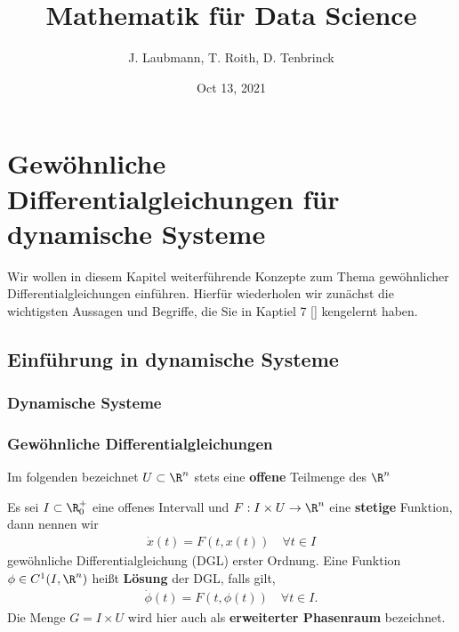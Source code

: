 \documentclass[letterpaper,10pt,english]{jupyterBook}
\title{Mathematik für Data Science}
\date{Oct 13, 2021}
\author{J.\@{} Laubmann, T.\@{} Roith, D.\@{} Tenbrinck}
\begin{document}
\label{\detokenize{intro::doc}}



\chapter{Gewöhnliche Differentialgleichungen für dynamische Systeme}
\label{\detokenize{ode/ode:gewohnliche-differentialgleichungen-fur-dynamische-systeme}}\label{\detokenize{ode/ode::doc}}
Wir wollen in diesem Kapitel weiterführende Konzepte zum Thema gewöhnlicher Differentialgleichungen einführen. Hierfür wiederholen wir zunächst die wichtigsten Aussagen und Begriffe, die Sie in Kaptiel 7 {[}{]} kengelernt haben.


\section{Einführung in dynamische Systeme}
\label{\detokenize{ode/motivation:einfuhrung-in-dynamische-systeme}}\label{\detokenize{ode/motivation::doc}}

\subsection{Dynamische Systeme}
\label{\detokenize{ode/motivation:dynamische-systeme}}

\subsection{Gewöhnliche Differentialgleichungen}
\label{\detokenize{ode/motivation:gewohnliche-differentialgleichungen}}
Im folgenden bezeichnet \(U\subset\R^n\) stets eine \textbf{offene} Teilmenge des \(\R^n\)
\label{ode/motivation:def:DGL}
\begin{definition}{}{}



Es sei \(I\subset\R^+_0\) eine offenes Intervall und \(F:I\times U\rightarrow\R^n\) eine \textbf{stetige} Funktion, dann nennen wir
\begin{align}\label{equation:ode/motivation:eq:DGL}
\dot{x}(t) = F(t, x(t))\quad\forall t\in I
\end{align}
gewöhnliche Differentialgleichung (DGL) erster Ordnung. Eine Funktion \(\phi\in C^1(I,\R^n)\) heißt \textbf{Lösung} der DGL, falls gilt,
\begin{align*}
\dot{\phi}(t) = F(t, \phi(t))\quad\forall t\in I.
\end{align*}
Die Menge \(G=I\times U\) wird hier auch als \textbf{erweiterter Phasenraum} bezeichnet.
\end{definition}
\end{document}
